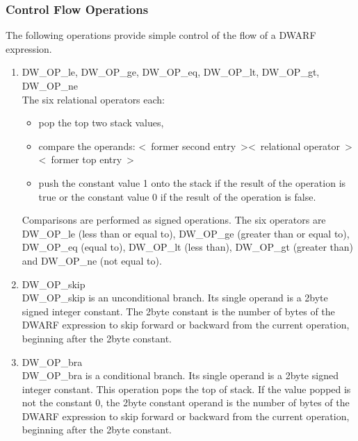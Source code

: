 \subsubsection{Control Flow Operations}
\label{chap:controlflowoperations}
The following operations provide simple control of the flow of a DWARF expression.
\begin{enumerate}[1]
\item  DW\_OP\_le, DW\_OP\_ge, DW\_OP\_eq, DW\_OP\_lt, DW\_OP\_gt, DW\_OP\_ne \\
The six relational operators each:
\begin{itemize}
\item pop the top two stack values,

\item compare the operands:
\textless~former second entry~\textgreater  \textless~relational operator~\textgreater \textless~former top entry~\textgreater

\item push the constant value 1 onto the stack 
if the result of the operation is true or the
constant value 0 if the result of the operation is false.
\end{itemize}

Comparisons are performed as signed operations. The six
operators are DW\_OP\_le (less than or equal to), DW\_OP\_ge
(greater than or equal to), DW\_OP\_eq (equal to), DW\_OP\_lt (less
than), DW\_OP\_gt (greater than) and DW\_OP\_ne (not equal to).

\item DW\_OP\_skip \\
DW\_OP\_skip is an unconditional branch. Its single operand
is a 2\dash byte signed integer constant. The 2\dash byte constant is
the number of bytes of the DWARF expression to skip forward
or backward from the current operation, beginning after the
2\dash byte constant.

\item DW\_OP\_bra \\
DW\_OP\_bra is a conditional branch. Its single operand is a
2\dash byte signed integer constant.  This operation pops the
top of stack. If the value popped is not the constant 0,
the 2\dash byte constant operand is the number of bytes of the
DWARF expression to skip forward or backward from the current
operation, beginning after the 2\dash byte constant.


\end{enumerate}
